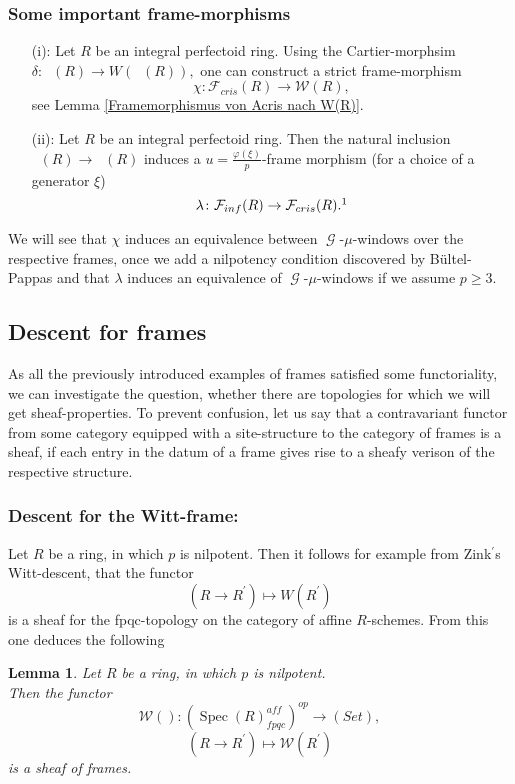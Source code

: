 \documentclass[a4paper,10,5 pt]{amsart}
\newtheorem{Lemma}[Satz]{Lemma}
\theoremstyle{definition}
\DeclareMathOperator{\Spec}{Spec}
\DeclareMathOperator{\Acris}{\mathbb{A}_{cris}}
\DeclareMathOperator{\Ainf}{\mathbb{A}_{inf}}
\DeclareMathOperator{\G}{\mathcal{G}}
\begin{document}
\subsubsection{Some important frame-morphisms}
\begin{enumerate}\label{Die zwei Framemorphismsen}
\item[(i):] Let $R$ be an integral perfectoid ring.
Using the Cartier-morphsim $\delta\colon \Acris(R)\rightarrow W(\Acris(R)),$ one can construct a strict frame-morphism
$$
\chi\colon \mathcal{F}_{cris}(R)\rightarrow \mathcal{W}(R),
$$
see Lemma \ref{Framemorphismus von Acris nach W(R)}.
\item[(ii):] Let $R$ be an integral perfectoid ring. Then the natural inclusion $\Ainf(R)\rightarrow \Acris(R)$ induces a $u=\frac{\varphi(\xi)}{p}$-frame morphism (for a choice of a generator $\xi$)
$$\lambda\colon \mathcal{F}_{inf}(R)\rightarrow \mathcal{F}_{cris}(R).\footnote{One has to check that $u$ is indeed a unit. For completeness, we recall the argument: write $\xi=(a_{0},a_{1},...)$ in Teichmueller-coordinates. Then $u\equiv \frac{[a_{0}]}{p}+[a_{1}]^{p}$ modulo $p\Acris(R),$ thus $u\equiv [a_{1}]^{p}$ modulo $\text{Fil}(\Acris(R))+p\Acris(R)$. But $\text{Fil}(\Acris(R))+p\Acris(R)$ is in the radical of $\Acris(R).$ As $a_{1}$ is a unit, we are done.}$$
\end{enumerate}
We will see that $\chi$ induces an equivalence between $\G$-$\mu$-windows over the respective frames, once we add a nilpotency condition discovered by Bültel-Pappas and that $\lambda$ induces an equivalence of $\G$-$\mu$-windows if we assume $p\geq 3.$
\subsection{Descent for frames}
As all the previously introduced examples of frames satisfied some functoriality, we can investigate the question, whether there are topologies for which we will get sheaf-properties. To prevent confusion, let us say that a contravariant functor from some category equipped with a site-structure to the category of frames is a sheaf, if each entry in the datum of a frame gives rise to a sheafy verison of the respective structure.
\subsubsection{Descent for the Witt-frame:}
Let $R$ be a ring, in which $p$ is nilpotent. Then it follows for example from Zink$^{\prime}$s Witt-descent, that the functor
$$ (R\rightarrow R^{\prime})\mapsto W(R^{\prime})$$
is a sheaf for the fpqc-topology on the category of affine $R$-schemes.
From this one deduces the following
\begin{Lemma}
Let $R$ be a ring, in which $p$ is nilpotent. 
\\
Then the functor
$$\mathcal{W}()\colon(\Spec(R)_{fpqc}^{aff})^{op} \rightarrow (Set),$$
$$(R\rightarrow R^{\prime}) \mapsto \mathcal{W}(R^{\prime})$$
is a sheaf of frames.
\end{Lemma}
\end{document}
